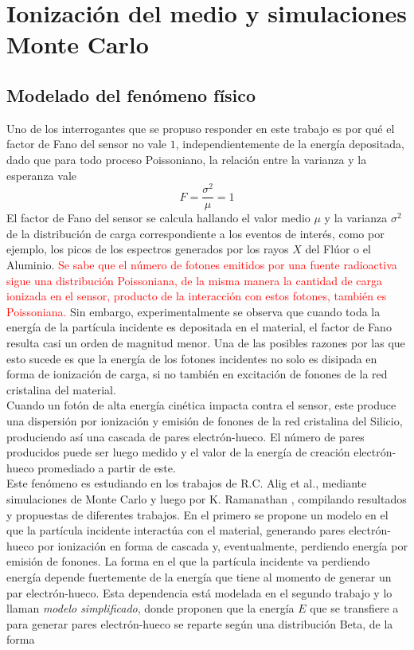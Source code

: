\chapter{Ionización del medio y simulaciones Monte Carlo}
\section{Modelado del fenómeno físico}
\noindent Uno de los interrogantes que se propuso responder en este trabajo es por qué el factor de Fano del sensor no vale $1$, independientemente de la energía depositada, dado que para todo proceso Poissoniano, la relación entre la varianza y la esperanza vale
\begin{equation*}
    F = \frac{\sigma^{2}}{\mu} = 1
\end{equation*} 
El factor de Fano del sensor se calcula hallando el valor medio $\mu$ y la varianza $\sigma^{2}$ de la distribución de carga correspondiente a los eventos de interés, como por ejemplo, los picos de los espectros generados por los rayos $X$ del Flúor o el Aluminio. \textcolor{red}{Se sabe que el número de fotones emitidos por una fuente radioactiva sigue una distribución Poissoniana, de la misma manera la cantidad de carga ionizada en el sensor, producto de la interacción con estos fotones, también es Poissoniana.} Sin embargo, experimentalmente se observa que cuando toda la energía de la partícula incidente es depositada en el material, el factor de Fano resulta casi un orden de magnitud menor\cite{TesisKevin}. Una de las posibles razones por las que esto sucede es que la energía de los fotones incidentes no solo es disipada en forma de ionización de carga, si no también en excitación de fonones de la red cristalina del material.\\
\indent Cuando un fotón de alta energía cinética impacta contra el sensor, este produce una dispersión por ionización y emisión de fonones de la red cristalina del Silicio, produciendo así una cascada de pares electrón-hueco. El número de pares producidos puede ser luego medido y el valor de la energía de creación electrón-hueco promediado a partir de este.\\
\indent Este fenómeno es estudiando en los trabajos de R.C. Alig et al.\cite{Alig}, mediante simulaciones de Monte Carlo y luego por K. Ramanathan \cite{Ramanathan}, compilando resultados y propuestas de diferentes trabajos. En el primero se propone un modelo en el que la partícula incidente interactúa con el material, generando pares electrón-hueco por ionización en forma de cascada y, eventualmente, perdiendo energía por emisión de fonones. La forma en el que la partícula incidente va perdiendo energía depende fuertemente de la energía que tiene al momento de generar un par electrón-hueco. Esta dependencia está modelada en el segundo trabajo y lo llaman \textit{modelo simplificado}, donde proponen que la energía $E$ que se transfiere a para generar pares electrón-hueco se reparte según una distribución Beta, de la forma
